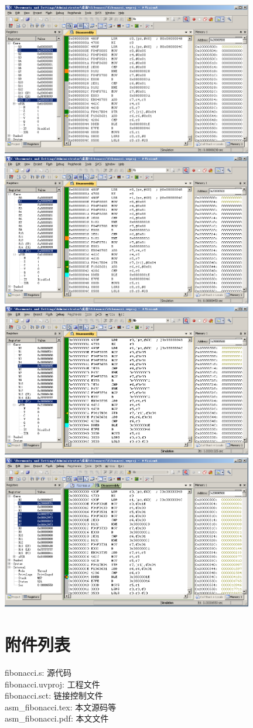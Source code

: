 \documentclass{ctexart}
\begin{document}
\begin{center}
\includegraphics[width=11cm]{./img/debugzero.png}
\includegraphics[width=11cm]{./img/debugone.png}
\includegraphics[width=11cm]{./img/debugfive.png}
\includegraphics[width=11cm]{./img/debugall.png}
\end{center}

\section{附件列表}

fibonacci.s: 源代码\\
fibonacci.uvproj: 工程文件\\
fibonacci.sct: 链接控制文件\\
asm\_fibonacci.tex: 本文源码等\\
asm\_fibonacci.pdf: 本文文件
\end{document}
